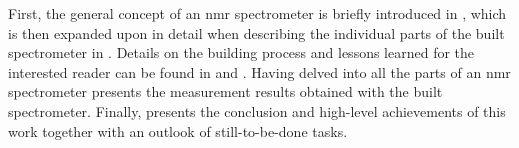 First, the general concept of an \acrshort{nmr} spectrometer is briefly introduced in , which is then expanded upon in detail when describing the individual parts of the built spectrometer in . Details on the building process and lessons learned for the interested reader can be found in  and . Having delved into all the parts of an \acrshort{nmr} spectrometer  presents the measurement results obtained with the built spectrometer. Finally,  presents the conclusion and high-level achievements of this work together with an outlook of still-to-be-done tasks.

